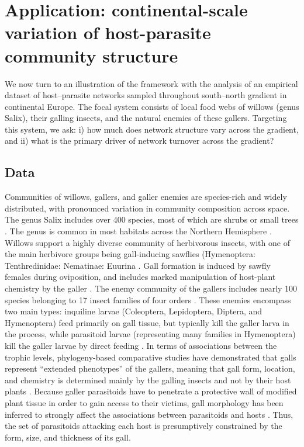 \documentclass[12pt]{article}
\begin{document}

\section*{Application: continental-scale variation of host-parasite community structure}

We now turn to an illustration of the framework with the analysis of an
empirical dataset of host–parasite networks sampled throughout south–north
gradient in continental Europe. The focal system consists of local food webs
of willows (genus Salix), their galling insects, and the natural enemies of
these gallers. Targeting this system, we ask: i) how much does network
structure vary across the gradient, and ii) what is the primary driver of
network turnover across the gradient?

\subsection*{Data}  

Communities of willows, gallers, and galler enemies are species-rich and
widely distributed, with pronounced variation in community composition across
space. The genus Salix includes over 400 species, most of which are shrubs or
small trees \citep{Argus1997}. The genus is common in most habitats across the
Northern Hemisphere \citep{Skvortsov1999}. Willows support a highly diverse
community of herbivorous insects, with one of the main herbivore groups being
gall-inducing sawflies (Hymenoptera: Tenthredinidae: Nematinae: Euurina
\citep{Kopelke1999}. Gall formation is induced by sawfly females during
oviposition, and includes marked manipulation of host-plant chemistry by the
galler \citep{Nyman2000}. The enemy community of the gallers includes nearly
100 species belonging to 17 insect families of four orders
\citep{Kopelke2000}. These enemies encompass two main types: inquiline larvae
(Coleoptera, Lepidoptera, Diptera, and Hymenoptera) feed primarily on gall
tissue, but typically kill the galler larva in the process, while parasitoid
larvae (representing many families in Hymenoptera) kill the galler larvae by
direct feeding \citep{Kopelke2003}. In terms of associations between the
trophic levels, phylogeny-based comparative studies have demonstrated that
galls represent “extended phenotypes” of the gallers, meaning that gall form,
location, and chemistry is determined mainly by the galling insects and not by
their host plants \citep{Nyman2000}. Because galler parasitoids have to
penetrate a protective wall of modified plant tissue in order to gain access
to their victims, gall morphology has been inferred to strongly affect the
associations between parasitoids and hosts \citep{Nyman2007}. Thus, the set of
parasitoids attacking each host is presumptively constrained by the form,
size, and thickness of its gall.
\end{document}
